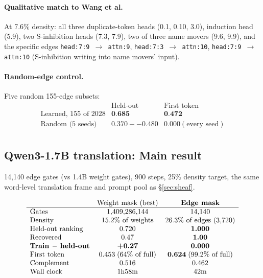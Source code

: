 \documentclass[11pt,a4paper]{article}
\begin{document}
\paragraph{Qualitative match to Wang et al.} At 7.6\% density: all three
duplicate-token heads (0.1, 0.10, 3.0), induction head (5.9), two S-inhibition heads
(7.3, 7.9), two of three name movers (9.6, 9.9), and the specific edges
\texttt{head:7:9 $\to$ attn:9}, \texttt{head:7:3 $\to$ attn:10}, \texttt{head:7:9
$\to$ attn:10} (S-inhibition writing into name movers' input).

\paragraph{Random-edge control.} Five random 155-edge subsets:
\[
\begin{array}{lcc}
& \text{Held-out} & \text{First token} \\ \hline
\text{Learned, 155 of 2028} & \textbf{0.685} & \textbf{0.472} \\
\text{Random (5 seeds)} & 0.370--0.480 & 0.000 (\text{every seed}) \\
\end{array}
\]

\subsection{Qwen3-1.7B translation: Main result}

14,140 edge gates (vs 1.4B weight gates), 900 steps, 25\% density target, the same
word-level translation frame and prompt pool as \S\ref{sec:sheaf}.

\[
\begin{array}{lcc}
& \text{Weight mask (best)} & \textbf{Edge mask} \\ \hline
\text{Gates} & 1{,}409{,}286{,}144 & 14{,}140 \\
\text{Density} & 15.2\% \text{ of weights} & 26.3\% \text{ of edges (3,720)} \\
\text{Held-out ranking} & 0.720 & \textbf{1.000} \\
\text{Recovered} & 0.47 & \textbf{1.00} \\
\text{\textbf{Train $-$ held-out}} & \textbf{+0.27} & \textbf{0.000} \\
\text{First token} & 0.453\;(64\%\text{ of full}) & \textbf{0.624}\;(99.2\%\text{ of full}) \\
\text{Complement} & 0.516 & 0.462 \\
\text{Wall clock} & 1\text{h}58\text{m} & 42\text{m} \\
\end{array}
\]
\end{document}
